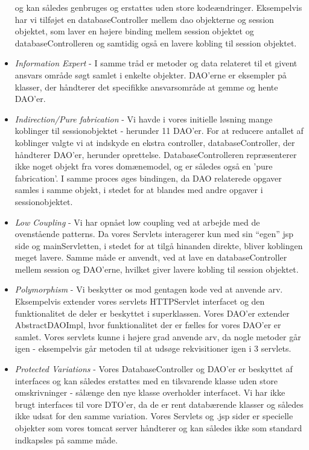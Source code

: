 \begin{itemize}
  og kan således genbruges og erstattes uden store kodeændringer. Eksempelvis
  har vi tilføjet en databaseController mellem dao objekterne og session
  objektet, som laver en højere binding mellem session objektet og
  databaseControlleren og samtidig også en lavere kobling til session objektet.
  \item \emph{Information Expert} - I samme tråd er metoder og data relateret
  til et givent ansvars område søgt samlet i enkelte objekter. DAO'erne er
  eksempler på klasser, der håndterer det specifikke ansvarsområde at gemme og
  hente DAO'er.
  \item \emph{Indirection/Pure fabrication} - Vi havde i vores initielle løsning
  mange koblinger til sessionobjektet - herunder 11 DAO'er. For at reducere
  antallet af koblinger valgte vi at indskyde en ekstra controller,
  databaseController, der håndterer DAO'er, herunder oprettelse.
  DatabaseControlleren repræsenterer ikke noget objekt fra vores domænemodel, og
  er således også en 'pure fabrication'. I samme proces øges bindingen, da DAO
  relaterede opgaver samles i samme objekt, i stedet for at blandes med andre
  opgaver i sessionobjektet.
  \item \emph{Low Coupling} - Vi har opnået low coupling ved at arbejde med de
  ovenstående patterns. Da vores Servlets interagerer kun med sin “egen” jsp
  side og mainServletten, i stedet for at tilgå hinanden direkte, bliver
  koblingen meget lavere. Samme måde er anvendt, ved at lave en
  databaseController mellem session og DAO’erne, hvilket giver lavere kobling
  til session objektet.
  \item \emph{Polymorphism} - Vi beskytter os mod gentagen kode ved at anvende
  arv. Eksempelvis extender vores servlets HTTPServlet interfacet og den
  funktionalitet de deler er beskyttet i superklassen. Vores DAO'er extender
  AbstractDAOImpl, hvor funktionalitet der er fælles for vores DAO'er er samlet.
  Vores servlets kunne i højere grad anvende arv, da nogle metoder går igen -
  eksempelvis går metoden til at udsøge rekvisitioner igen i 3 servlets.
  \item \emph{Protected Variations} - Vores DatabaseController og DAO'er er
  beskyttet af interfaces og kan således erstattes med en tilsvarende klasse uden store
  omskrivninger - sålænge den nye klasse overholder interfacet. Vi har ikke
  brugt interfaces til vore DTO'er, da de er rent databærende klasser og således
  ikke udsat for den samme variation. Vores Servlets og .jsp sider er specielle
  objekter som vores tomcat server håndterer og kan således ikke som standard
  indkapsles på samme måde.
\end{itemize}
